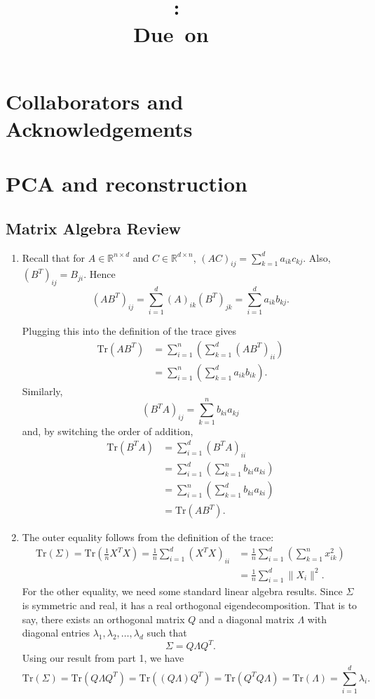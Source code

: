 \documentclass{article}
\title{
    \vspace{2in}
    \textmd{\textbf{\hmwkClass:\ \hmwkTitle}}\\
    \normalsize\vspace{0.1in}\small{Due\ on\ \hmwkDueDate\ }\\
    \vspace{3in}
}
\author{\textbf{\hmwkAuthorName}}
\date{}
\newcommand{\R}{\mathbb{R}}
\newcommand{\Tr}{\mathrm{Tr}}
\begin{document}
\maketitle

\pagebreak

\section{Collaborators and Acknowledgements}


\section{PCA and reconstruction}
\subsection{Matrix Algebra Review}
\begin{enumerate}
	\item Recall that for $A\in\R^{n\times d}$ and $C\in\R^{d\times n}$, $(AC)_{ij} = \sum^d_{k=1}a_{ik}c_{kj}$. Also, $(B^T)_{ij} = B_{ji}$. Hence
	\[
		(AB^T)_{ij} = \sum^d_{i=1}(A)_{ik}(B^T)_{jk} = \sum^d_{i=1}a_{ik}b_{kj}.
	\]

	Plugging this into the definition of the trace gives
	\begin{align*}
		\Tr(AB^T) &= \sum^n_{i=1}\left(\sum^d_{k=1}(AB^T)_{ii}\right)\\
		&= \sum^n_{i=1}\left(\sum^d_{k=1}a_{ik}b_{ik}\right).
	\end{align*}
	Similarly,
	\[
		(B^TA)_{ij} = \sum^{n}_{k=1}b_{ki}a_{kj}
	\]
	and, by switching the order of addition,
	\begin{align*}
		\Tr(B^TA) &= \sum^d_{i=1}\left(B^TA\right)_{ii}\\
		&= \sum^d_{i=1}\left(\sum^n_{k=1}b_{ki}a_{ki} \right) \\
		&= \sum^n_{i=1}\left(\sum^d_{k=1}b_{ki}a_{ki} \right) \\
		&= \Tr(AB^T).
	\end{align*}

	\item The outer equality follows from the definition of the trace:
	\begin{align*}
		\Tr(\Sigma) = \Tr\left(\tfrac1nX^TX\right) = \frac1n\sum^d_{i=1}(X^TX)_{ii} &= \frac1n \sum^d_{i=1}\left( \sum^n_{k=1}x_{ik}^2 \right)\\
		&= \frac1n\sum^d_{i=1}\|X_i\|^2.
	\end{align*}
	For the other equality, we need some standard linear algebra results. Since $\Sigma$ is symmetric and real, it has a real orthogonal eigendecomposition. That is to say, there exists an orthogonal matrix $Q$ and a diagonal matrix $\Lambda$ with diagonal entries $\lambda_1,\lambda_2,\dots,\lambda_d$ such that
	\[
		\Sigma = Q\Lambda Q^T.
	\]
	Using our result from part 1, we have
	\[
		\Tr(\Sigma) = \Tr\left(Q\Lambda Q^T\right) = \Tr\left((Q\Lambda) Q^T\right) = \Tr\left(Q^TQ\Lambda\right) = \Tr(\Lambda) = \sum^d_{i=1}\lambda_i.
	\]
\end{enumerate}
\end{document}
